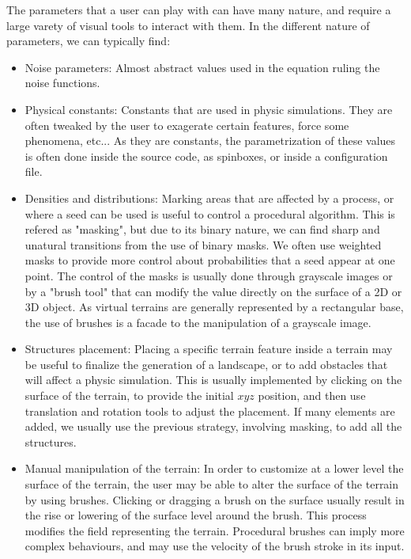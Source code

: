 The parameters that a user can play with can have many nature, and require a large varety of visual tools to interact with them. In the different nature of parameters, we can typically find: 
\begin{itemize}
    \item Noise parameters: Almost abstract values used in the equation ruling the noise functions. 
    \item Physical constants: Constants that are used in physic simulations. They are often tweaked by the user to exagerate certain features, force some phenomena, etc... As they are constants, the parametrization of these values is often done inside the source code, as spinboxes, or inside a configuration file. 
    \item Densities and distributions: Marking areas that are affected by a process, or where a seed can be used is useful to control a procedural algorithm. This is refered as "masking", but due to its binary nature, we can find sharp and unatural transitions from the use of binary masks. We often use weighted masks to provide more control about probabilities that a seed appear at one point. The control of the masks is usually done through grayscale images or by a "brush tool" that can modify the value directly on the surface of a 2D or 3D object. As virtual terrains are generally represented by a rectangular base, the use of brushes is a facade to the manipulation of a grayscale image.
    \item Structures placement: Placing a specific terrain feature inside a terrain may be useful to finalize the generation of a landscape, or to add obstacles that will affect a physic simulation. This is usually implemented by clicking on the surface of the terrain, to provide the initial $xyz$ position, and then use translation and rotation tools to adjust the placement. If many elements are added, we usually use the previous strategy, involving masking, to add all the structures.
    \item Manual manipulation of the terrain: In order to customize at a lower level the surface of the terrain, the user may be able to alter the surface of the terrain by using brushes. Clicking or dragging a brush on the surface usually result in the rise or lowering of the surface level around the brush. This process modifies the field representing the terrain. Procedural brushes can imply more complex behaviours, and may use the velocity of the brush stroke in its input.
\end{itemize}


